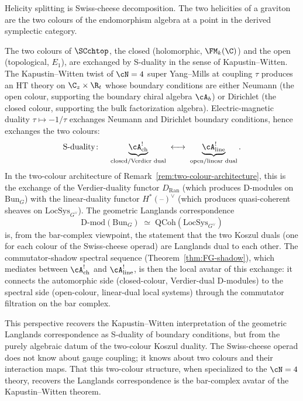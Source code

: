 Helicity splitting is Swiss-cheese decomposition. The two helicities
of a graviton are the two colours of the endomorphism algebra at a
point in the derived symplectic category.

\begin{remark}
\label{rem:s-duality-colour-exchange}
The two colours of $\SCchtop$, the closed (holomorphic,
$\FM_k(\C)$) and the open (topological, $E_1$), are exchanged by
S-duality in the sense of Kapustin--Witten. The Kapustin--Witten
twist of $\cN=4$ super Yang--Mills at coupling $\tau$ produces an HT
theory on $\C_z \times \R_t$ whose boundary conditions are either
Neumann (the open colour, supporting the boundary chiral algebra
$\cA_b$) or Dirichlet (the closed colour, supporting the bulk
factorization algebra). Electric-magnetic duality $\tau \mapsto
-1/\tau$ exchanges Neumann and Dirichlet boundary conditions, hence
exchanges the two colours:
\[
 \text{S-duality}\colon\quad
 \underbrace{\cA^!_{\mathrm{ch}}}_{\text{closed/Verdier dual}}
 \;\longleftrightarrow\;
 \underbrace{\cA^!_{\mathrm{line}}}_{\text{open/linear dual}}.
\]
In the two-colour architecture of
Remark~\ref{rem:two-colour-architecture}, this is the exchange of the
Verdier-duality functor $D_{\mathrm{Ran}}$ (which produces
D-modules on $\mathrm{Bun}_G$) with the linear-duality functor
$H^*(\text{--})^\vee$ (which produces quasi-coherent sheaves on
$\mathrm{LocSys}_{G^\vee}$). The geometric Langlands
correspondence
\[
 \mathrm{D}\text{-}\mathrm{mod}(\mathrm{Bun}_G)
 \;\simeq\;
 \mathrm{QCoh}(\mathrm{LocSys}_{G^\vee})
\]
is, from the bar-complex viewpoint, the statement that the two
Koszul duals (one for each colour of the Swiss-cheese operad)
are Langlands dual to each other. The commutator-shadow spectral
sequence (Theorem~\ref{thm:FG-shadow}), which mediates between
$\cA^!_{\mathrm{ch}}$ and $\cA^!_{\mathrm{line}}$, is then the
local avatar of this exchange: it connects the automorphic side
(closed-colour, Verdier-dual D-modules) to the spectral side
(open-colour, linear-dual local systems) through the commutator
filtration on the bar complex.

This perspective recovers the Kapustin--Witten interpretation of the
geometric Langlands correspondence as S-duality of boundary conditions,
but from the purely algebraic datum of the two-colour Koszul
duality. The Swiss-cheese operad does not know about gauge
coupling; it knows about two colours and their interaction maps.
That this two-colour structure, when specialized to the
$\cN=4$ theory, recovers the Langlands correspondence is the
bar-complex avatar of the Kapustin--Witten theorem.
\end{remark}

